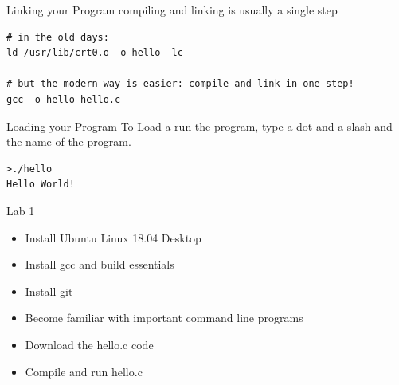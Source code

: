 \documentclass[10pt]{beamer}
\begin{document}
\begin{frame}[fragile]{Linking your Program}
compiling and linking is usually a single step
\begin{verbatim}
# in the old days:
ld /usr/lib/crt0.o -o hello -lc

# but the modern way is easier: compile and link in one step!
gcc -o hello hello.c

\end{verbatim}
\end{frame}
\begin{frame}[fragile]{Loading your Program}
To Load a run the program, type a dot and a slash and the name of the program.
\begin{verbatim}
>./hello
Hello World!
\end{verbatim}

\end{frame}
\begin{frame}[fragile]{Lab 1}
\begin{itemize}
\item Install Ubuntu Linux 18.04 Desktop
\item Install gcc and build essentials
\item Install git
\item Become familiar with important command line programs
\item Download the hello.c code
\item Compile and run hello.c
\end{itemize}
\end{frame}
\end{document}
